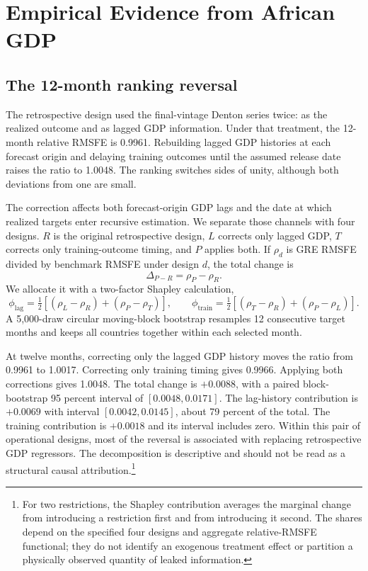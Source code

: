 \documentclass[preprint,12pt,authoryear]{elsarticle}
\begin{document}
\section{Empirical Evidence from African GDP}\label{sec:application}

\subsection{The 12-month ranking reversal}

The retrospective design used the final-vintage Denton series twice: as the realized outcome and as lagged GDP information. Under that treatment, the 12-month relative RMSFE is 0.9961. Rebuilding lagged GDP histories at each forecast origin and delaying training outcomes until the assumed release date raises the ratio to 1.0048. The ranking switches sides of unity, although both deviations from one are small.



The correction affects both forecast-origin GDP lags and the date at which realized targets enter recursive estimation. We separate those channels with four designs. $R$ is the original retrospective design, $L$ corrects only lagged GDP, $T$ corrects only training-outcome timing, and $P$ applies both. If $\rho_d$ is GRE RMSFE divided by benchmark RMSFE under design $d$, the total change is
\[
\Delta_{P-R}=\rho_P-\rho_R.
\]
We allocate it with a two-factor Shapley calculation,
\[
\phi_{\mathrm{lag}}=\tfrac12[(\rho_L-\rho_R)+(\rho_P-\rho_T)],\qquad
\phi_{\mathrm{train}}=\tfrac12[(\rho_T-\rho_R)+(\rho_P-\rho_L)].
\]
A 5,000-draw circular moving-block bootstrap resamples 12 consecutive target months and keeps all countries together within each selected month.



At twelve months, correcting only the lagged GDP history moves the ratio from 0.9961 to 1.0017. Correcting only training timing gives 0.9966. Applying both corrections gives 1.0048. The total change is $+0.0088$, with a paired block-bootstrap 95 percent interval of $[0.0048,0.0171]$. The lag-history contribution is $+0.0069$ with interval $[0.0042,0.0145]$, about 79 percent of the total. The training contribution is $+0.0018$ and its interval includes zero. Within this pair of operational designs, most of the reversal is associated with replacing retrospective GDP regressors. The decomposition is descriptive and should not be read as a structural causal attribution.\footnote{For two restrictions, the Shapley contribution averages the marginal change from introducing a restriction first and from introducing it second. The shares depend on the specified four designs and aggregate relative-RMSFE functional; they do not identify an exogenous treatment effect or partition a physically observed quantity of leaked information.}
\end{document}
